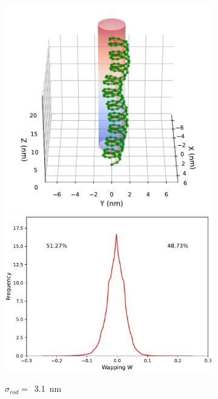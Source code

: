 \documentclass[a4paper,10pt]{article}
\begin{document}
\begin{figure}[tb]
\begin{subfigure}{.3\textwidth}
\includegraphics[width=\textwidth]{r1_B_2000000_17.pdf}
\includegraphics[width=\textwidth]{r1_B_wr_pr.pdf}
\caption{$\sigma_{rod}=$~\SI{3.1}{\nm}}
\label{fig:r1_b}
\end{subfigure}
\begin{subfigure}{.3\textwidth}

\end{subfigure}
\end{figure}
\end{document}
